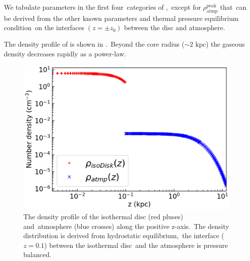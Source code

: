 \documentclass[twocolumn]{aastex631}
\begin{document}
  We tabulate parameters in the first four\
  categories of ,\
  except for $\rho_{\text{atmp}}^{\text{peak}}$ that\
  can be derived from the other known parameters and thermal pressure equilibrium condition\
  on the interfaces $(z=\pm z_{0})$ between the disc and atmosphere.\

  The density profile of \Cref{disc-atm-sys} is shown in .\
  Beyond the core radius ($\sim 2 \text{ kpc}$) the gaseous density decreases rapidly as a power-law.

%

  \begin{figure}
    \includegraphics[width=\columnwidth]{figures/fig__initial-density-profile.png}
    \caption{The density profile of the isothermal disc (red pluses) and\
             atmosphere (blue crosses) along the positive z-axis.\
             The density distribution is derived from hydrostatic equilibrium,\
             the interface ($z=0.1$) between the isothermal disc\
             and the atmosphere is pressure balanced.}
    \label{fig__initial-density-profile}
  \end{figure}
\end{document}
